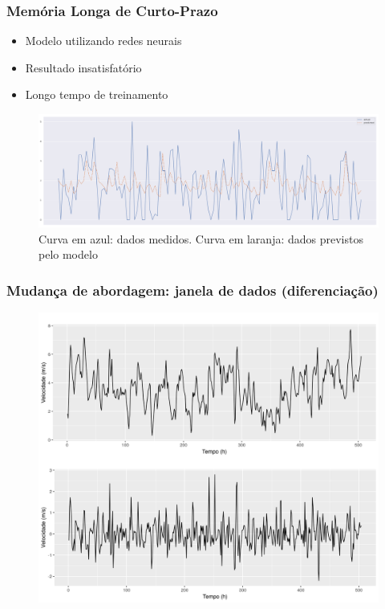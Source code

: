 \documentclass[mathserif,serif]{beamer}
\begin{document}
\begin{frame}
	\frametitle{Memória Longa de Curto-Prazo}

	\begin{itemize}
		\item Modelo utilizando redes neurais
		\item Resultado insatisfatório	
		\item Longo tempo de treinamento
	\end{itemize}
	
	\begin{figure}
		\centering
		\includegraphics[width=\textwidth]{lstm.png}
		\caption{Curva em azul: dados medidos. Curva em laranja: dados previstos pelo modelo}
	\end{figure}
\end{frame}

\begin{frame}
	\frametitle{Mudança de abordagem: janela de dados (diferenciação)}
	\begin{figure}
		\centering
		\includegraphics[scale=0.37]{last3weeks.png}
	\end{figure}
\end{frame}
\end{document}
